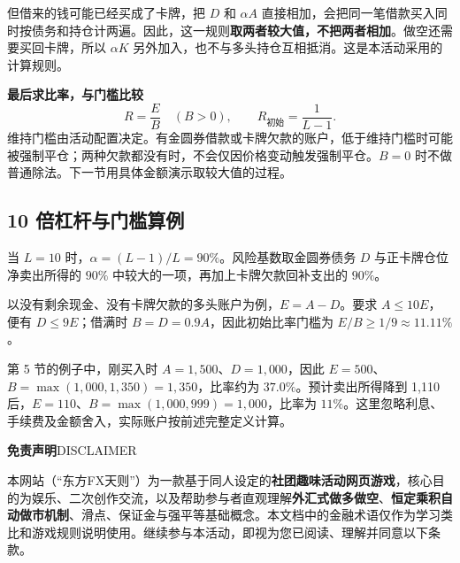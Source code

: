\documentclass[11pt,a4paper,twoside]{article}
\begin{document}
但借来的钱可能已经买成了卡牌，把 $D$ 和 $\alpha A$ 直接相加，会把同一笔借款买入同时按债务和持仓计两遍。因此，这一规则\textbf{取两者较大值，不把两者相加}。做空还需要买回卡牌，所以 $\alpha K$ 另外加入，也不与多头持仓互相抵消。这是本活动采用的计算规则。

\textbf{最后求比率，与门槛比较}
\[
 R=\frac{E}{B}\quad(B>0),\qquad
 R_{\text{初始}}=\frac{1}{L-1}.
\]
维持门槛由活动配置决定。有金圆券借款或卡牌欠款的账户，低于维持门槛时可能被强制平仓；两种欠款都没有时，不会仅因价格变动触发强制平仓。$B=0$ 时不做普通除法。下一节用具体金额演示取较大值的过程。

\subsection{10 倍杠杆与门槛算例}

当 $L=10$ 时，$\alpha=(L-1)/L=90\%$。风险基数取金圆券债务 $D$ 与正卡牌仓位净卖出所得的 $90\%$ 中较大的一项，再加上卡牌欠款回补支出的 $90\%$。

以没有剩余现金、没有卡牌欠款的多头账户为例，$E=A-D$。要求 $A\le10E$，便有 $D\le9E$；借满时 $B=D=0.9A$，因此初始比率门槛为 $E/B\ge1/9\approx11.11\%$。

第 5 节的例子中，刚买入时 $A=1{,}500$、$D=1{,}000$，因此 $E=500$、$B=\max(1{,}000,1{,}350)=1{,}350$，比率约为 $37.0\%$。预计卖出所得降到 1,110 后，$E=110$、$B=\max(1{,}000,999)=1{,}000$，比率为 $11\%$。这里忽略利息、手续费及金额舍入，实际账户按前述完整定义计算。

\endgroup
\clearpage
\pagestyle{empty}
\vspace*{0.1cm}
{\sffamily\bfseries\Large 免责声明}\hfill{\sffamily\small\color{soft}DISCLAIMER}\par
\vspace{0.25em}
\noindent\makebox[\linewidth][c]{\textcolor{rule}{\rule{0.88\linewidth}{1pt}}}
\vspace{0.5em}

\small
\setlength{\parskip}{0.34em}
\linespread{1.0}\selectfont

本网站（“东方FX天则”）为一款基于同人设定的\textbf{社团趣味活动网页游戏}，核心目的为娱乐、二次创作交流，以及帮助参与者直观理解\textbf{外汇式做多做空}、\textbf{恒定乘积自动做市机制}、滑点、保证金与强平等基础概念。本文档中的金融术语仅作为学习类比和游戏规则说明使用。继续参与本活动，即视为您已阅读、理解并同意以下条款。

\vspace{0.2em}
\noindent\makebox[\linewidth][c]{\textcolor{rule}{\rule{0.62\linewidth}{0.4pt}}}
\vspace{0.2em}
\end{document}
